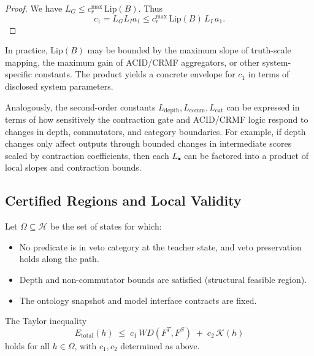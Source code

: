 \documentclass[11pt]{article}
\theoremstyle{definition}
\theoremstyle{plain}
\theoremstyle{remark}
\begin{document}
\begin{proof}
We have \(L_G \le c_r^{\max} \,\text{Lip}(B)\). Thus
\[
  c_1 = L_G L_I a_1 \le c_r^{\max}\,\text{Lip}(B)\,L_I\,a_1.
\]
\end{proof}

\begin{aremark}
In practice, \(\text{Lip}(B)\) may be bounded by the maximum slope of truth-scale mapping, the maximum gain of ACID/CRMF aggregators, or other system-specific constants. The product yields a concrete envelope for \(c_1\) in terms of disclosed system parameters.
\end{aremark}

\begin{aremark}
Analogously, the second-order constants \(L_{\text{depth}},L_{\text{comm}},L_{\text{cat}}\) can be expressed in terms of how sensitively the contraction gate and ACID/CRMF logic respond to changes in depth, commutators, and category boundaries. For example, if depth changes only affect outputs through bounded changes in intermediate scores scaled by contraction coefficients, then each \(L_{\bullet}\) can be factored into a product of local slopes and contraction bounds.
\end{aremark}

\subsection{Certified Regions and Local Validity}

\begin{adefn}
Let \(\Omega \subseteq \mathcal{H}\) be the set of states for which:
\begin{itemize}[leftmargin=2em]
  \item No predicate is in veto category at the teacher state, and veto preservation holds along the path.
  \item Depth and non-commutator bounds are satisfied (structural feasible region).
  \item The ontology snapshot and model interface contracts are fixed.
\end{itemize}
\end{adefn}

\begin{athm}
The Taylor inequality
\[
  E_{\text{total}}(h)
  \;\le\;
  c_1\, WD(F^T,F^S)
  \;+\;
  c_2 \,\mathcal{K}(h)
\]
holds for all \(h \in \Omega\), with \(c_1,c_2\) determined as above.
\end{athm}
\end{document}
